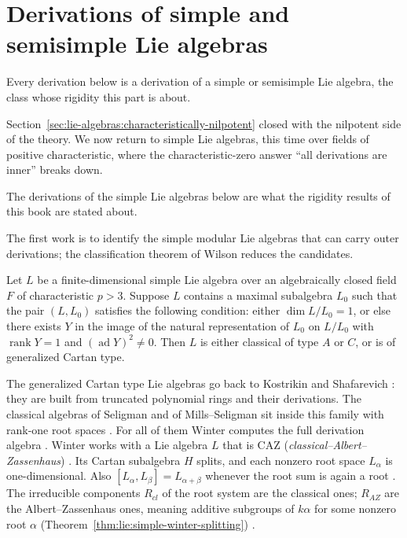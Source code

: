 \section{Derivations of simple and semisimple Lie algebras}\label{sec:lie-algebras:simple}

Every derivation below is a derivation of a simple or semisimple Lie algebra,
the class whose rigidity this part is about. %

Section~\ref{sec:lie-algebras:characteristically-nilpotent} closed with
the nilpotent side of the theory.  We now return to simple Lie algebras,
this time over fields of positive characteristic, where the
characteristic-zero answer ``all derivations are inner'' breaks down.

The derivations of the simple Lie algebras below are what the rigidity results
of this book are stated about. %

The first work is to identify the simple modular Lie algebras that can
carry outer derivations; the classification theorem of Wilson
\cite[Theorem~1, p.~1--419]{Wilson1976} reduces the candidates.

\begin{theorem}\label{thm:lie:simple-wilson-classification}
Let $L$ be a finite-dimensional simple Lie algebra over an algebraically
closed field $F$ of characteristic $p>3$.  Suppose $L$ contains a maximal
subalgebra $L_{0}$ such that the pair $(L,L_{0})$ satisfies the following
condition: either $\dim L/L_{0}=1$, or else there exists $Y$ in the image
of the natural representation of $L_{0}$ on $L/L_{0}$ with
$\operatorname{rank} Y=1$ and $(\operatorname{ad} Y)^{2}\neq 0$.  Then $L$
is either classical of type $A$ or $C$, or is of generalized Cartan type.
\end{theorem}

The generalized Cartan type Lie algebras go back to Kostrikin and Shafarevich
\cite[p.~418]{Wilson1976}: they are built from truncated polynomial rings and
their derivations. The classical algebras of Seligman and of Mills--Seligman
sit inside this family with rank-one root spaces \cite[p.~962]{Winter1984}.
For all of them Winter computes the full derivation algebra \cite[Theorems~3.4
and 3.6, pp.~970--971]{Winter1984}. Winter works with a Lie algebra $L$ that
is CAZ (\emph{classical--Albert--Zassenhaus}) \cite[p.~962]{Winter1984}. Its
Cartan subalgebra $H$ splits, and each nonzero root space $L_{\alpha}$ is
one-dimensional. Also $[L_{\alpha},L_{\beta}]=L_{\alpha+\beta}$ whenever the
root sum is again a root \cite[p.~962]{Winter1984}. The irreducible components
$R_{cl}$ of the root system are the classical ones; $R_{AZ}$ are the
Albert--Zassenhaus ones, meaning additive subgroups of $k\alpha$ for some
nonzero root $\alpha$ (Theorem~\ref{thm:lie:simple-winter-splitting})
\cite[p.~962]{Winter1984}.

